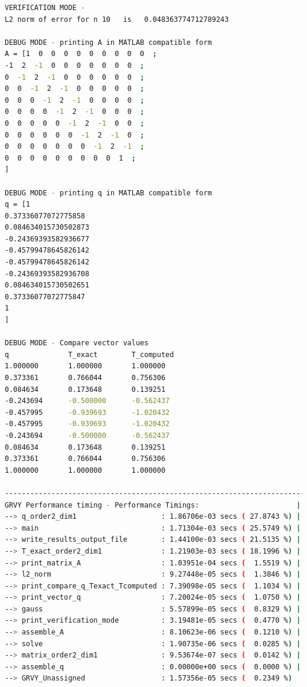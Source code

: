 \documentclass[12 pt, final]{article}
\begin{document}
\begin{itemize}
\begin{lstlisting}[language = bash, basicstyle=\tiny]
VERIFICATION MODE -
L2 norm of error for n 10   is   0.048363774712789243

DEBUG MODE - printing A in MATLAB compatible form
A = [1  0  0  0  0  0  0  0  0  0  ;
-1  2  -1  0  0  0  0  0  0  0  ;
0  -1  2  -1  0  0  0  0  0  0  ;
0  0  -1  2  -1  0  0  0  0  0  ;
0  0  0  -1  2  -1  0  0  0  0  ;
0  0  0  0  -1  2  -1  0  0  0  ;
0  0  0  0  0  -1  2  -1  0  0  ;
0  0  0  0  0  0  -1  2  -1  0  ;
0  0  0  0  0  0  0  -1  2  -1  ;
0  0  0  0  0  0  0  0  0  1  ;
]

DEBUG MODE - printing q in MATLAB compatible form
q = [1
0.37336077072775858
0.084634015730502873
-0.24369393582936677
-0.45799478645826142
-0.45799478645826142
-0.24369393582936708
0.084634015730502651
0.37336077072775847
1
]

DEBUG MODE - Compare vector values
q              T_exact        T_computed 
1.000000       1.000000       1.000000   
0.373361       0.766044       0.756306   
0.084634       0.173648       0.139251   
-0.243694      -0.500000      -0.562437  
-0.457995      -0.939693      -1.020432  
-0.457995      -0.939693      -1.020432  
-0.243694      -0.500000      -0.562437  
0.084634       0.173648       0.139251   
0.373361       0.766044       0.756306   
1.000000       1.000000       1.000000   

------------------------------------------------------------------------------------------------------------
GRVY Performance timing - Performance Timings:                       |      Mean      Variance       Count
--> q_order2_dim1                    : 1.86706e-03 secs ( 27.8743 %) | [1.86706e-03  0.00000e+00          1]
--> main                             : 1.71304e-03 secs ( 25.5749 %) | [1.71304e-03  0.00000e+00          1]
--> write_results_output_file        : 1.44100e-03 secs ( 21.5135 %) | [1.44100e-03  0.00000e+00          1]
--> T_exact_order2_dim1              : 1.21903e-03 secs ( 18.1996 %) | [1.21903e-03  0.00000e+00          1]
--> print_matrix_A                   : 1.03951e-04 secs (  1.5519 %) | [1.03951e-04  0.00000e+00          1]
--> l2_norm                          : 9.27448e-05 secs (  1.3846 %) | [3.39725e-07  2.79576e-13        273]
--> print_compare_q_Texact_Tcomputed : 7.39098e-05 secs (  1.1034 %) | [7.39098e-05  0.00000e+00          1]
--> print_vector_q                   : 7.20024e-05 secs (  1.0750 %) | [7.20024e-05  0.00000e+00          1]
--> gauss                            : 5.57899e-05 secs (  0.8329 %) | [5.57899e-05  0.00000e+00          1]
--> print_verification_mode          : 3.19481e-05 secs (  0.4770 %) | [3.19481e-05  0.00000e+00          1]
--> assemble_A                       : 8.10623e-06 secs (  0.1210 %) | [8.10623e-06  0.00000e+00          1]
--> solve                            : 1.90735e-06 secs (  0.0285 %) | [1.90735e-06  0.00000e+00          1]
--> matrix_order2_dim1               : 9.53674e-07 secs (  0.0142 %) | [9.53674e-07  0.00000e+00          1]
--> assemble_q                       : 0.00000e+00 secs (  0.0000 %) | [0.00000e+00  0.00000e+00          1]
--> GRVY_Unassigned                  : 1.57356e-05 secs (  0.2349 %)


\end{lstlisting}
\end{itemize}
\end{document}
